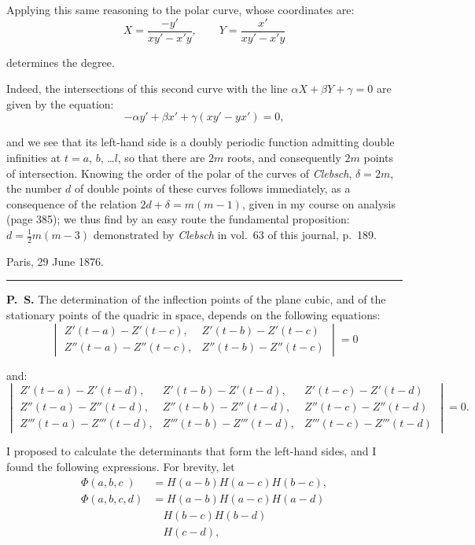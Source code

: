 \documentclass[12pt]{article}
\begin{document}
Applying this same reasoning to the polar curve, whose coordinates are:
\begin{equation*}
X = \frac{-y'}{xy'-x'y}, \qquad Y = \frac{x'}{xy'-x'y}
\end{equation*}

\noindent determines the degree.

Indeed, the intersections of this second curve with the line $\alpha X + \beta Y + \gamma = 0$ are given by the equation:
\begin{equation*}
-\alpha y' + \beta x' + \gamma(xy'-yx') = 0,
\end{equation*}

\noindent and we see that its left-hand side is a doubly periodic function admitting double infinities at $t=a$, $b$, \ldots $l$, so that there are $2m$ roots, and consequently $2m$ points of intersection. 
Knowing the order of the polar of the curves of \textit{Clebsch}, $\delta = 2m$, the number $d$ of double points of these curves follows immediately, as a consequence of the relation
$2d + \delta = m(m-1)$, given in my course on analysis (page 385); we thus find by an easy route the fundamental proposition: $d = \frac{1}{2}m(m-3)$ demonstrated by \textit{Clebsch} in vol.\ 63 of this journal, p.\ 189.

Paris, 29 June 1876.

\bigskip
\hrule
\bigskip

\noindent \textbf{P.\ S.} The determination of the inflection points of the plane cubic, and of the stationary points of the quadric in space, depends on the following equations:
\begin{equation*}
\begin{vmatrix}
Z'(t-a)-Z'(t-c), & Z'(t-b)-Z'(t-c) \\
Z''(t-a)-Z''(t-c), & Z''(t-b)-Z''(t-c)
\end{vmatrix}
= 0
\end{equation*}

\noindent and:
\begin{equation*}
\begin{vmatrix}
Z'(t-a)-Z'(t-d), & Z'(t-b)-Z'(t-d), & Z'(t-c)-Z'(t-d) \\
Z''(t-a)-Z''(t-d), & Z''(t-b)-Z''(t-d), & Z''(t-c)-Z''(t-d) \\
Z'''(t-a)-Z'''(t-d), & Z'''(t-b)-Z'''(t-d), & Z'''(t-c)-Z'''(t-d)
\end{vmatrix}
= 0.
\end{equation*}

\noindent I proposed to calculate the determinants that form the left-hand sides, and I found the following expressions. For brevity, let
\begin{align*}
\Phi(a,b,c\;) &= H(a-b)H(a-c)H(b-c),\\
\Phi(a,b,c,d) &= H(a-b)H(a-c)H(a-d)\\
&\quad H(b-c)H(b-d)\\
&\quad H(c-d),
\end{align*}
\end{document}
